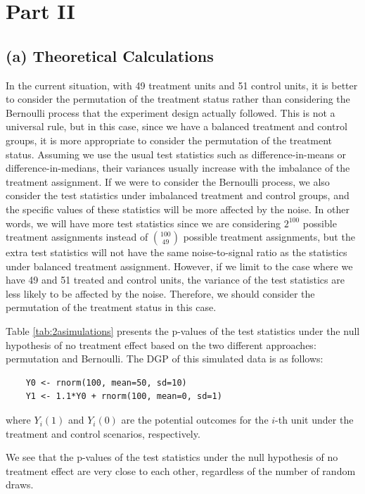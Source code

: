 \documentclass[11pt]{article}
\numberwithin{equation}{section}
\begin{document}
\section{Part II}
\label{sec:part_ii}
\subsection*{(a) Theoretical Calculations}

In the current situation, with 49 treatment units and 51 control units, it is better to consider the permutation of the treatment status rather than considering the Bernoulli process that the experiment design actually followed.
This is not a universal rule, but in this case, since we have a balanced treatment and control groups, it is more appropriate to consider the permutation of the treatment status.
Assuming we use the usual test statistics such as difference-in-means or difference-in-medians, their variances usually increase with the imbalance of the treatment assignment.
If we were to consider the Bernoulli process, we also consider the test statistics under imbalanced treatment and control groups, and the specific values of these statistics will be more affected by the noise.
In other words, we will have more test statistics since we are considering $2^{100}$ possible treatment assignments instead of $\binom{100}{49}$ possible treatment assignments, but the extra test statistics will not have the same noise-to-signal ratio as the statistics under balanced treatment assignment.
However, if we limit to the case where we have 49 and 51 treated and control units, the variance of the test statistics are less likely to be affected by the noise.
Therefore, we should consider the permutation of the treatment status in this case.




Table \ref{tab:2asimulations} presents the p-values of the test statistics under the null hypothesis of no treatment effect based on the two different approaches: permutation and Bernoulli.
The DGP of this simulated data is as follows:

\begin{verbatim}
    Y0 <- rnorm(100, mean=50, sd=10)
    Y1 <- 1.1*Y0 + rnorm(100, mean=0, sd=1)
\end{verbatim}

where $Y_i(1)$ and $Y_i(0)$ are the potential outcomes for the $i$-th unit under the treatment and control scenarios, respectively.

We see that the p-values of the test statistics under the null hypothesis of no treatment effect are very close to each other, regardless of the number of random draws.
\end{document}
